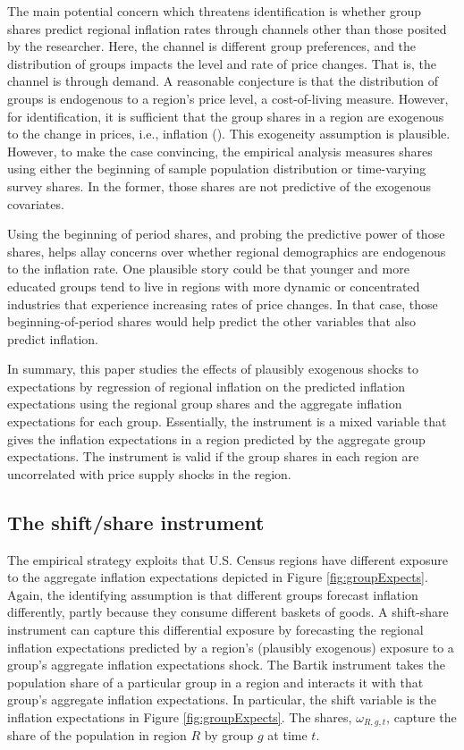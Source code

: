\documentclass[12pt]{article}
\begin{document}
The main potential concern which threatens identification is whether group shares predict regional inflation rates through channels other than those posited by the researcher. Here, the channel is different group preferences, and the distribution of groups impacts the level and rate of price changes. That is, the channel is through demand. A reasonable conjecture is that the distribution of groups is endogenous to a region's price level, a cost-of-living measure. However, for identification, it is sufficient that the group shares in a region are exogenous to the change in prices, i.e., inflation (\cite{Pinkhametal:AER2020}). This exogeneity assumption is plausible. However, to make the case convincing, the empirical analysis measures shares using either the beginning of sample population distribution or time-varying survey shares. In the former, those shares are not predictive of the exogenous covariates.

Using the beginning of period shares, and probing the predictive power of those shares, helps allay concerns over whether regional demographics are endogenous to the inflation rate. One plausible story could be that younger and more educated groups tend to live in regions with more dynamic or concentrated industries that experience increasing rates of price changes. In that case, those beginning-of-period shares would help predict the other variables that also predict inflation.  

In summary, this paper studies the effects of plausibly exogenous shocks to expectations by regression of regional inflation on the predicted inflation expectations using the regional group shares and the aggregate inflation expectations for each group. Essentially, the instrument is a mixed variable that gives the inflation expectations in a region predicted by the aggregate group expectations. The instrument is valid if the group shares in each region are uncorrelated with price supply shocks in the region.

 \subsection{The shift/share instrument}


The empirical strategy exploits that U.S. Census regions have different exposure to the aggregate inflation expectations depicted in Figure \ref{fig:groupExpects}. Again, the identifying assumption is that different groups forecast inflation differently, partly because they consume different baskets of goods. A shift-share instrument can capture this differential exposure by forecasting the regional inflation expectations predicted by a region's (plausibly exogenous) exposure to a group's aggregate inflation expectations shock. The Bartik instrument takes the population share of a particular group in a region and interacts it with that group's aggregate inflation expectations. In particular, the shift variable is the inflation expectations in Figure \ref{fig:groupExpects}. The shares, $\omega_{R,g,t}$, capture the share of the population in region $R$ by group $g$ at time $t$.  
\end{document}
